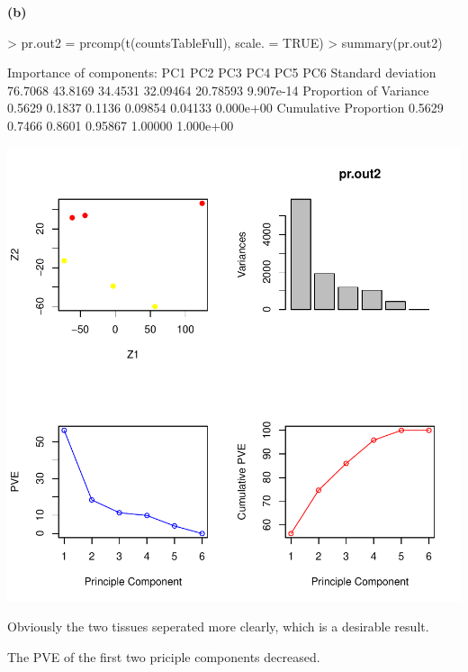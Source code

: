 \documentclass[a4paper]{article}
\renewcommand{\part}[1] {\vspace{.10in} {\bf (#1)}}
\begin{document}
\part{b}
\begin{Schunk}
\begin{Sinput}
> pr.out2 = prcomp(t(countsTableFull), scale. = TRUE)
> summary(pr.out2)
\end{Sinput}
\begin{Soutput}
Importance of components:
                           PC1     PC2     PC3      PC4      PC5       PC6
Standard deviation     76.7068 43.8169 34.4531 32.09464 20.78593 9.907e-14
Proportion of Variance  0.5629  0.1837  0.1136  0.09854  0.04133 0.000e+00
Cumulative Proportion   0.5629  0.7466  0.8601  0.95867  1.00000 1.000e+00
\end{Soutput}
\end{Schunk}
\includegraphics{pca-1b}
\begin{enumerate}
{\color{red}
\item Obviously the two tissues seperated more clearly, which is a desirable result.
\item The PVE of the first two priciple components decreased.
}
\end{enumerate}
\end{document}
